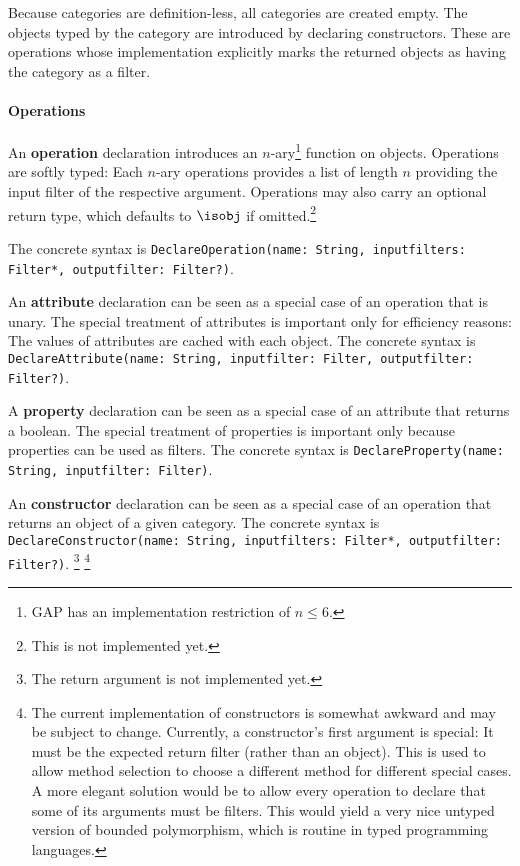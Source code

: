 Because categories are definition-less, all categories are created empty.
The objects typed by the category are introduced by declaring constructors.
These are operations whose implementation explicitly marks the returned objects as having the category as a filter.

\paragraph{Operations}
An \textbf{operation} declaration introduces an $n$-ary\footnote{GAP has an implementation restriction of $n\leq 6$.} function on objects.
Operations are softly typed: Each $n$-ary operations provides a list of length $n$ providing the input filter of the respective argument.
Operations may also carry an optional return type, which defaults to $\isobj$ if omitted.\footnote{This is not implemented yet.}

The concrete syntax is
 \lstinline|DeclareOperation(name: String, inputfilters: Filter*, outputfilter: Filter?)|.

An \textbf{attribute} declaration can be seen as a special case of an operation that is unary.
The special treatment of attributes is important only for efficiency reasons: The values of attributes are cached with each object.
The concrete syntax is \lstinline|DeclareAttribute(name: String, inputfilter: Filter, outputfilter: Filter?)|.

A \textbf{property} declaration can be seen as a special case of an attribute that returns a boolean.
The special treatment of properties is important only because properties can be used as filters.
The concrete syntax is \lstinline|DeclareProperty(name: String, inputfilter: Filter)|.

An \textbf{constructor} declaration can be seen as a special case of an operation that returns an object of a given category.
The concrete syntax is \lstinline|DeclareConstructor(name: String, inputfilters: Filter*, outputfilter: Filter?)|.
\footnote{The return argument is not implemented yet.}
\footnote{The current implementation of constructors is somewhat awkward and may be subject to change. Currently, a constructor's first argument is special: It must be the expected return filter (rather than an object). This is used to allow method selection to choose a different method for different special cases.
A more elegant solution would be to allow every operation to declare that some of its arguments must be filters.
This would yield a very nice untyped version of bounded polymorphism, which is routine in typed programming languages.}

